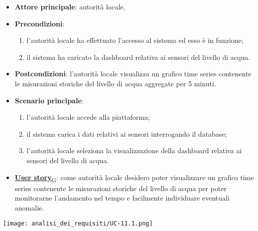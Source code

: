 \begin{itemize}
	\item \textbf{Attore principale}: autorità locale.
	\item \textbf{Precondizioni}:
	      \begin{enumerate}
		      \item l'autorità locale ha effettuato l'accesso al sistema ed esso è in funzione;
		      \item il sistema ha caricato la dashboard relativa ai sensori del livello di acqua.
	      \end{enumerate}
	\item \textbf{Postcondizioni}: l'autorità locale visualizza un grafico time series contenente le misurazioni storiche
	      del livello di acqua aggregate per 5 minuti.
	\item \textbf{Scenario principale}:
	      \begin{enumerate}
		      \item l'autorità locale accede alla piattaforma;
		      \item il sistema carica i dati relativi ai sensori interrogando il database;
		      \item l'autorità locale seleziona la visualizzazione della dashboard relativa ai sensori del livello di acqua.
	      \end{enumerate}
	\item \href{https://7last.github.io/docs/rtb/documentazione-interna/glossario\#user-story}{\textbf{User story}\textsubscript{G}}:
	      come autorità locale desidero poter visualizzare un grafico time series contenente le misurazioni storiche
	      del livello di acqua per poter monitorarne l'andamento nel tempo e facilmente individuare eventuali anomalie.
\end{itemize}
\begin{center}
	\texttt{[image: analisi\_dei\_requisiti/UC-11.1.png]}
\end{center}


